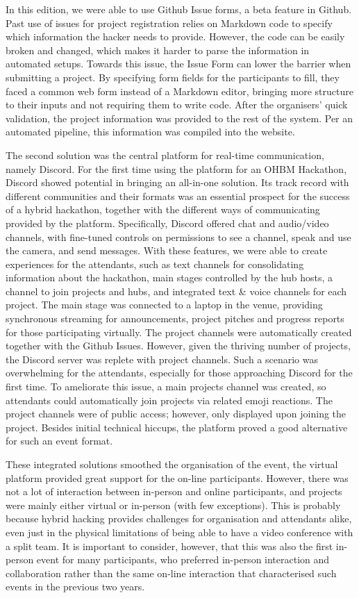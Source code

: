 \documentclass[10pt,a4paper,twocolumns]{proc}
\begin{document}
In this edition, we were able to use Github Issue forms, a beta feature
in Github. Past use of issues for project registration relies on
Markdown code to specify which information the hacker needs to provide.
However, the code can be easily broken and changed, which makes it
harder to parse the information in automated setups. Towards this issue,
the Issue Form can lower the barrier when submitting a project. By
specifying form fields for the participants to fill, they faced a common
web form instead of a Markdown editor, bringing more structure to their
inputs and not requiring them to write code. After the organisers' quick
validation, the project information was provided to the rest of the
system. Per an automated pipeline, this information was compiled into
the website.

The second solution was the central platform for real-time
communication, namely Discord. For the first time using the platform for
an OHBM Hackathon, Discord showed potential in bringing an all-in-one
solution. Its track record with different communities and their formats
was an essential prospect for the success of a hybrid hackathon,
together with the different ways of communicating provided by the
platform. Specifically, Discord offered chat and audio/video channels,
with fine-tuned controls on permissions to see a channel, speak and use
the camera, and send messages. With these features, we were able to
create experiences for the attendants, such as text channels for
consolidating information about the hackathon, main stages controlled by
the hub hosts, a channel to join projects and hubs, and integrated text
\& voice channels for each project. The main stage was connected to a
laptop in the venue, providing synchronous streaming for announcements,
project pitches and progress reports for those participating virtually.
The project channels were automatically created together with the Github
Issues. However, given the thriving number of projects, the Discord
server was replete with project channels. Such a scenario was
overwhelming for the attendants, especially for those approaching
Discord for the first time. To ameliorate this issue, a main projects
channel was created, so attendants could automatically join projects via
related emoji reactions. The project channels were of public access;
however, only displayed upon joining the project. Besides initial
technical hiccups, the platform proved a good alternative for such an
event format.

These integrated solutions smoothed the organisation of the event, the
virtual platform provided great support for the on-line participants.
However, there was not a lot of interaction between in-person and online
participants, and projects were mainly either virtual or in-person (with
few exceptions). This is probably because hybrid hacking provides
challenges for organisation and attendants alike, even just in the
physical limitations of being able to have a video conference with a
split team. It is important to consider, however, that this was also the
first in-person event for many participants, who preferred in-person
interaction and collaboration rather than the same on-line interaction
that characterised such events in the previous two years.
\end{document}
